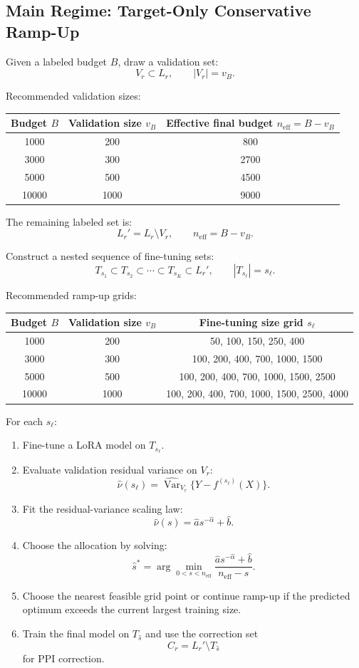 \documentclass[11pt]{article}
\begin{document}
\subsection{Main Regime: Target-Only Conservative Ramp-Up}

Given a labeled budget $B$, draw a validation set:
\[
V_r\subset L_r, \qquad |V_r|=v_B.
\]

Recommended validation sizes:

\begin{longtable}{ccc}
\toprule
Budget $B$ & Validation size $v_B$ & Effective final budget $n_{\mathrm{eff}}=B-v_B$ \\
\midrule
1000 & 200 & 800 \\
3000 & 300 & 2700 \\
5000 & 500 & 4500 \\
10000 & 1000 & 9000 \\
\bottomrule
\end{longtable}

The remaining labeled set is:
\[
L_r'=L_r\setminus V_r, \qquad n_{\mathrm{eff}}=B-v_B.
\]

Construct a nested sequence of fine-tuning sets:
\[
T_{s_1}\subset T_{s_2}\subset \cdots \subset T_{s_K}\subset L_r',
\qquad |T_{s_\ell}|=s_\ell.
\]

Recommended ramp-up grids:

\begin{longtable}{ccc}
\toprule
Budget $B$ & Validation size $v_B$ & Fine-tuning size grid $s_\ell$ \\
\midrule
1000 & 200 & 50, 100, 150, 250, 400 \\
3000 & 300 & 100, 200, 400, 700, 1000, 1500 \\
5000 & 500 & 100, 200, 400, 700, 1000, 1500, 2500 \\
10000 & 1000 & 100, 200, 400, 700, 1000, 1500, 2500, 4000 \\
\bottomrule
\end{longtable}

For each $s_\ell$:

\begin{enumerate}
    \item Fine-tune a LoRA model on $T_{s_\ell}$.
    \item Evaluate validation residual variance on $V_r$:
    \[
    \widehat{\nu}(s_\ell)=\widehat{\operatorname{Var}}_{V_r}\{Y-f^{(s_\ell)}(X)\}.
    \]
    \item Fit the residual-variance scaling law:
    \[
    \widehat{\nu}(s)=\hat a s^{-\hat\alpha}+\hat b.
    \]
    \item Choose the allocation by solving:
    \[
    \hat s^*
    =
    \arg\min_{0<s<n_{\mathrm{eff}}}
    \frac{\hat a s^{-\hat\alpha}+\hat b}{n_{\mathrm{eff}}-s}.
    \]
    \item Choose the nearest feasible grid point or continue ramp-up if the predicted optimum exceeds the current largest training size.
    \item Train the final model on $T_{\hat s}$ and use the correction set
    \[
    C_r=L_r'\setminus T_{\hat s}
    \]
    for PPI correction.
\end{enumerate}
\end{document}

